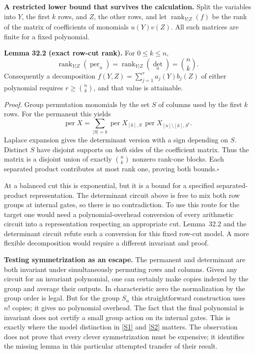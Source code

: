 \documentclass[11pt,a4paper]{article}
\newcommand{\sref}[2]{\hyperlink{source:#1:#2}{[S#2]}}
\numberwithin{equation}{section}
\begin{document}
\medskip
\textbf{A restricted lower bound that survives the calculation.}
Split the variables into $Y$, the first $k$ rows, and $Z$, the other rows,
and let $\operatorname{rank}_{Y|Z}(f)$ be the rank of the matrix of coefficients
of monomials $u(Y)v(Z)$. All such matrices are finite for a fixed polynomial.

\textbf{Lemma 32.2 (exact row-cut rank).}
For $0\le k\le n$,
\begin{equation}\label{r32:cut}
 \operatorname{rank}_{Y|Z}(\operatorname{per}_n)
 =\operatorname{rank}_{Y|Z}(\det_n)=\binom nk.
\end{equation}
Consequently a decomposition
$f(Y,Z)=\sum_{j=1}^r a_j(Y)b_j(Z)$ of either polynomial requires
$r\ge\binom nk$, and that value is attainable.

\emph{Proof.} Group permutation monomials by the set $S$ of columns used
by the first $k$ rows. For the permanent this yields
\[
 \operatorname{per}X=\sum_{|S|=k}
     \operatorname{per}X_{[k],S}\,
     \operatorname{per}X_{[n]\setminus[k],S^c}.
\]
Laplace expansion gives the determinant version with a sign depending on
$S$. Distinct $S$ have disjoint supports on \emph{both} sides of the
coefficient matrix. Thus the matrix is a disjoint union of exactly
$\binom nk$ nonzero rank-one blocks. Each separated product contributes
at most rank one, proving both bounds.\hfill$\square$

At a balanced cut this is exponential, but it is a bound for a specified
separated-product representation. The determinant circuit above is free
to mix both row groups at internal gates, so there is no contradiction.
To use this route for the target one would need a polynomial-overhead
conversion of every arithmetic circuit into a representation respecting
an appropriate cut. Lemma~32.2 and the determinant circuit refute such a
conversion for this fixed row-cut model. A more flexible decomposition
would require a different invariant and proof.

\medskip
\textbf{Testing symmetrization as an escape.}
The permanent and determinant are both invariant under simultaneously
permuting rows and columns. Given any circuit for an invariant polynomial,
one can certainly make copies indexed by the group and average their
outputs. In characteristic zero the normalization by the group order is
legal. But for the group $S_n$ this straightforward construction uses
$n!$ copies; it gives no polynomial overhead. The fact that the final
polynomial is invariant does not certify a small group action on its
internal gates. This is exactly where the model distinction in
\sref{32}{1} and \sref{32}{2} matters. The observation does not prove that
every clever symmetrization must be expensive; it identifies the missing
lemma in this particular attempted transfer of their result.
\end{document}

